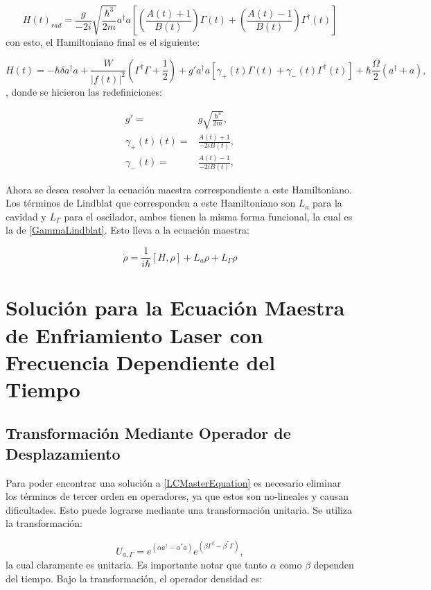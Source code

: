 \documentclass[a4paper,10pt]{report}
\begin{document}
\begin{equation}
H(t)_{rad} = \frac{g}{-2i}\sqrt{\frac{\hbar^3}{2m}}  a^\dagger a[(\frac{A(t) +1}{B(t)})\Gamma (t) +(\frac{A(t) -1}{B(t)})\Gamma^\dagger (t)]
\end{equation} con esto, el Hamiltoniano final es el siguiente:

\begin{equation}\label{LaserCoolingHamiltonian}
H(t) = -\hbar \delta a^\dagger a + \frac{W}{|f(t)|^2}(\Gamma^\dagger \Gamma + \frac{1}{2}) +  g'a^\dagger a[\gamma_+(t)\Gamma (t) +\gamma_-(t)\Gamma^\dagger (t)] + \hbar\frac{\Omega}{2}(a^\dagger + a),
\end{equation}, donde se hicieron las redefiniciones:

\begin{align*}
g'=&g\sqrt{\frac{\hbar^3}{2m}},\\
\gamma_+(t)(t)=&\frac{A(t) +1}{-2iB(t)},\\
\gamma_-(t)=&\frac{A(t) -1}{-2iB(t)},
\end{align*} 

Ahora se desea resolver la ecuación maestra correspondiente a este Hamiltoniano. Los términos de Lindblat que corresponden a este Hamiltoniano son $L_a$ para la cavidad y $L_\Gamma$ para el oscilador, ambos tienen la misma forma funcional, la cual es la de \ref{GammaLindblat}. Esto lleva a la ecuación maestra:

\begin{equation}\label{LCMasterEquation}
\dot{\rho} = \frac{1}{i\hbar}[H,\rho] + L_a\rho + L_\Gamma \rho
\end{equation}

\chapter{Solución para la Ecuación Maestra de Enfriamiento Laser con Frecuencia Dependiente del Tiempo}

\section{Transformación Mediante Operador de Desplazamiento}

Para poder encontrar una solución a \ref{LCMasterEquation} es necesario eliminar los términos de tercer orden en operadores, ya que estos son no-lineales y causan dificultades. Esto puede lograrse mediante una transformación unitaria. Se utiliza la transformación:

\begin{equation}
U_{a,\Gamma} = e^{(\alpha a^\dagger - \alpha^*a)}e^{(\beta \Gamma^\dagger - \beta^*\Gamma)},
\end{equation}la cual claramente es unitaria. Es importante notar que tanto $\alpha$ como $\beta$ dependen del tiempo. Bajo la transformación, el operador densidad es:
\end{document}
